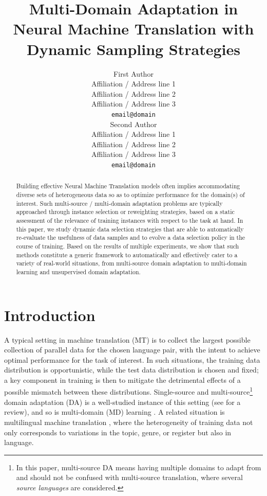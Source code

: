 \documentclass[11pt]{article}
\title{Multi-Domain Adaptation in Neural Machine Translation with Dynamic Sampling Strategies}
\author{First Author \\
  Affiliation / Address line 1 \\
  Affiliation / Address line 2 \\
  Affiliation / Address line 3 \\
  \texttt{email@domain} \\\And
  Second Author \\
  Affiliation / Address line 1 \\
  Affiliation / Address line 2 \\
  Affiliation / Address line 3 \\
  \texttt{email@domain} \\}
\date{}
\newcommand{\fyDone}[1]{\done[FY]\Todo[FY:]{\textcolor{orange}{#1}}}
\newcommand{\revision}[1]{\textcolor{red}{#1}}
\begin{document}
\maketitle
\setlength{\abovedisplayskip}{2pt}
\setlength{\belowdisplayskip}{2pt}
\begin{abstract}
  Building effective Neural Machine Translation models often implies accommodating diverse sets of heterogeneous data so as to optimize performance for the domain(s) of interest. Such multi-source / multi-domain adaptation problems are typically approached through instance selection or reweighting strategies, based on a static assessment of the relevance of training instances with respect to the task at hand. In this paper, we study dynamic data selection strategies that are able to automatically re-evaluate the usefulness of data samples and to evolve a data selection policy in the course of training. Based on the results of multiple experiments, we show that such methods constitute a generic framework to automatically and effectively cater to a variety of real-world situations, from multi-source domain adaptation to multi-domain learning and unsupervised domain adaptation. 
\end{abstract}

\section{Introduction}\label{sec:intro}
A typical setting in machine translation (MT) is to collect the largest possible collection of parallel data for the chosen language pair, with the intent to achieve optimal performance for the task of interest. In such situations, the training data distribution is opportunistic, while the test data distribution is chosen and fixed; a key component in training is then to mitigate the detrimental effects of a possible mismatch between these distributions. Single-source and multi-source\footnote{In this paper, multi-source DA means having multiple domains to adapt from and should not be confused with multi-source translation, where several \emph{source languages} are considered.} domain adaptation (DA) is a well-studied instance of this setting (see \citet{Chu2017comparison,Saunders21asurvey} for a review), and so is multi-domain (MD) learning \citep{Chu18multilingual,Zeng18multidomain,Jiang19multidomain,Pham21revisiting}. A related situation is multilingual machine translation \citep{Firat16multiway,Ha16towards,Johnson17google,Aharoni19massively},\fyDone{Fix ref}
where the heterogeneity of training data not only corresponds to variations in the topic, genre, or register but also in language.
\end{document}
